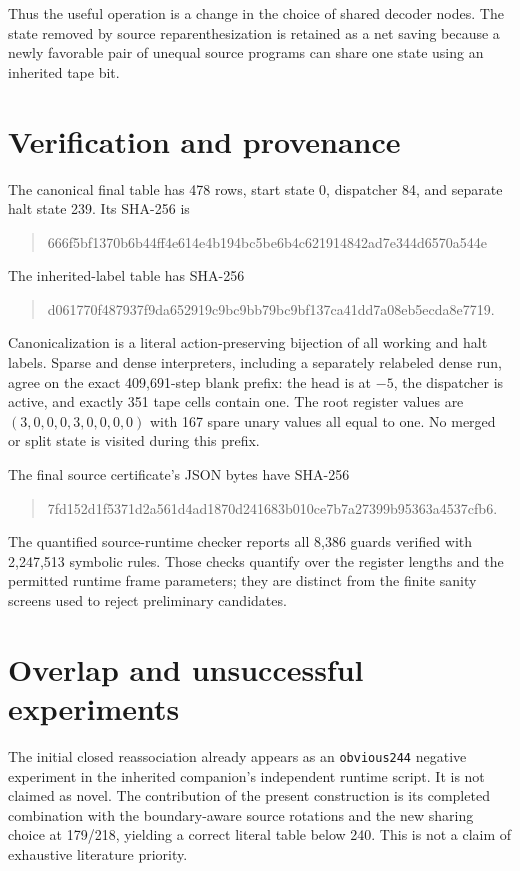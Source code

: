 \documentclass[10pt]{article}
\begin{document}
Thus the useful operation is a change in the choice of shared decoder
nodes. The state removed by source reparenthesization is retained as a net
saving because a newly favorable pair of unequal source programs can share
one state using an inherited tape bit.

\section{Verification and provenance}
The canonical final table has 478 rows, start state 0, dispatcher 84, and
separate halt state 239. Its SHA-256 is
\begin{quote}\small\ttfamily
666f5bf1370b6b44ff4e614e4b194bc5be6b4c621914842ad7e344d6570a544e
\end{quote}
The inherited-label table has SHA-256
\begin{quote}\small\ttfamily
d061770f487937f9da652919c9bc9bb79bc9bf137ca41dd7a08eb5ecda8e7719.
\end{quote}
Canonicalization is a literal action-preserving bijection of all working and
halt labels. Sparse and dense interpreters, including a separately relabeled
dense run, agree on the exact 409,691-step blank prefix: the head is at $-5$,
the dispatcher is active, and exactly 351 tape cells contain one. The root
register values are $(3,0,0,0,3,0,0,0,0)$ with 167 spare unary values all equal
to one. No merged or split state is visited during this prefix.

The final source certificate's JSON bytes have SHA-256
\begin{quote}\small\ttfamily
7fd152d1f5371d2a561d4ad1870d241683b010ce7b7a27399b95363a4537cfb6.
\end{quote}
The quantified source-runtime checker reports all 8,386 guards verified with
2,247,513 symbolic rules. Those checks quantify over the register lengths
and the permitted runtime frame parameters; they are distinct from the
finite sanity screens used to reject preliminary candidates.

\section{Overlap and unsuccessful experiments}
The initial closed reassociation already appears as an \texttt{obvious244}
negative experiment in the inherited companion's independent runtime script.
It is not claimed as novel. The contribution of the present construction is
its completed combination with the boundary-aware source rotations and the
new sharing choice at 179/218, yielding a correct literal table below 240.
This is not a claim of exhaustive literature priority.
\end{document}

